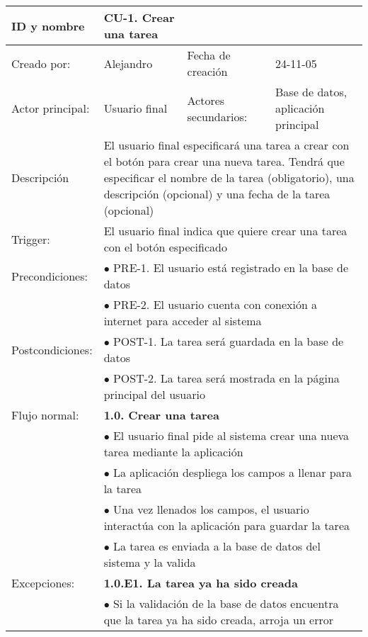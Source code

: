 \begin{center}
\begin{tabular}{p{3cm}p{5cm}p{4cm}p{2cm}}
  \hline
  ID y nombre & CU-1. Crear una tarea & & \\
  \hline
  Creado por: & Alejandro & Fecha de creaci\'on & 24-11-05\\
  \hline
  Actor principal: & Usuario final & Actores secundarios: & Base de datos, aplicaci\'on principal\\
  \hline
  Descripci\'on & \multicolumn{3}{p{11cm}}{El usuario final especificar\'a una tarea a crear con el bot\'on para crear una nueva tarea. Tendr\'a que especificar el nombre de la tarea (obligatorio), una descripci\'on (opcional) y una fecha de la tarea (opcional)}\\
  \hline
  Trigger: & \multicolumn{3}{p{11cm}}{El usuario final indica que quiere crear una tarea con el bot\'on especificado}\\
  \hline
  Precondiciones: & \multicolumn{3}{p{11cm}}{$\bullet$ PRE-1. El usuario est\'a registrado en la base de datos}\\
		  & \multicolumn{3}{p{11cm}}{$\bullet$ PRE-2. El usuario cuenta con conexi\'on a internet para acceder al sistema}\\
  \hline
  Postcondiciones: & \multicolumn{3}{p{11cm}}{$\bullet$ POST-1. La tarea ser\'a guardada en la base de datos}\\
		   & \multicolumn{3}{p{11cm}}{$\bullet$ POST-2. La tarea ser\'a mostrada en la p\'agina principal del usuario}\\
  \hline
  Flujo normal: & \multicolumn{3}{p{11cm}}{\textbf{1.0. Crear una tarea}}\\
		& \multicolumn{3}{p{11cm}}{$\bullet$ El usuario final pide al sistema crear una nueva tarea mediante la aplicaci\'on}\\
		& \multicolumn{3}{p{11cm}}{$\bullet$ La aplicaci\'on despliega los campos a llenar para la tarea}\\
		& \multicolumn{3}{p{11cm}}{$\bullet$ Una vez llenados los campos, el usuario interact\'ua con la aplicaci\'on para guardar la tarea}\\
		& \multicolumn{3}{p{11cm}}{$\bullet$ La tarea es enviada a la base de datos del sistema y la valida}\\
  \hline
  Excepciones: & \multicolumn{3}{p{11cm}}{\textbf{1.0.E1. La tarea ya ha sido creada}}\\
	       & \multicolumn{3}{p{11cm}}{$\bullet$ Si la validaci\'on de la base de datos encuentra que la tarea ya ha sido creada, arroja un error}\\

\end{tabular}
\end{center}
